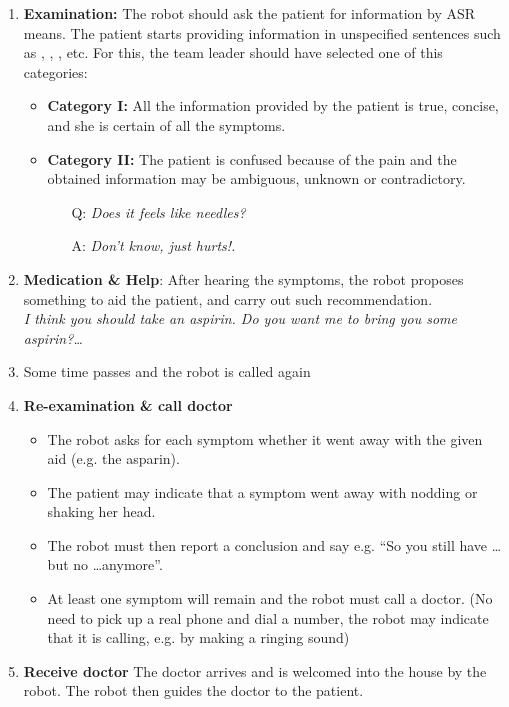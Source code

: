 \begin{enumerate}
\item \textbf{Examination:} The robot should ask the patient for information by ASR means. The patient starts providing information in unspecified sentences such as , , ,  etc. For this, the team leader should have selected one of this categories:
\begin{itemize}
\item \textbf{Category I:} All the information provided by the patient is true, concise, and she is certain of all the symptoms.
\item \textbf{Category II:} The patient is confused because of the pain and the obtained information  may be ambiguous, unknown or contradictory. %
\begin{itemize}
\item[Q:] \textit{Does it feels like needles?}
\item[A:] \textit{Don't know, just hurts!.}
\end{itemize}
\end{itemize}
\item \textbf{Medication \& Help}: After hearing the symptoms, the robot proposes something to aid the patient, and carry out such recommendation.\\ \textit{I think you should take an aspirin. Do you want me to bring you some aspirin?\dots}
\item Some time passes and the robot is called again
\item \textbf{Re-examination \& call doctor} 
\begin{itemize}
 \item The robot asks for each symptom whether it went away with the given aid (e.g. the asparin).
 \item The patient may indicate that a symptom went away with nodding or shaking her head. 
 \item The robot must then report a conclusion and say e.g. ``So you still have \dots but no \dots anymore''.
 \item At least one symptom will remain and the robot must call a doctor. 
  (No need to pick up a real phone and dial a number, the robot may indicate that it is calling, e.g. by making a ringing sound)
\end{itemize}
\item \textbf{Receive doctor} The doctor arrives and is welcomed into the house by the robot. The robot then guides the doctor to the patient.

\end{enumerate}
